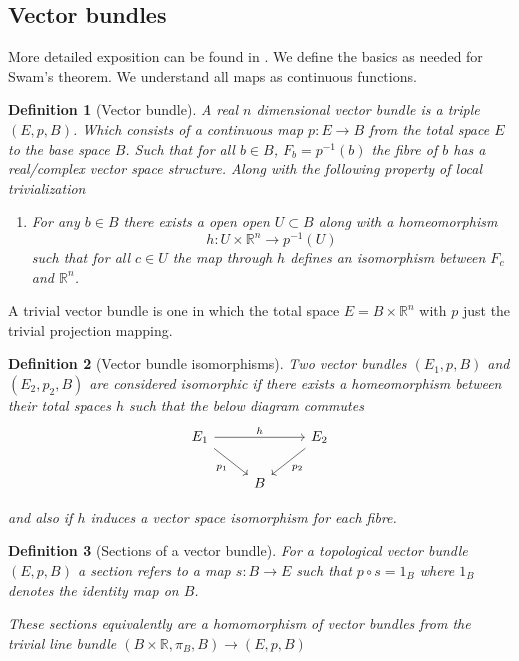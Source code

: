 \documentclass[12pt]{article}
\numberwithin{equation}{section}
\newcommand{\R}{\mathbb{R}}
\newtheorem{definition}{Definition}[section]
\begin{document}
\begin{appendices}
	
	\section{Vector bundles}
	More detailed exposition can be found in \cite{milnor1974characteristic}. We define the basics as needed for Swam's theorem. We understand all maps as continuous functions.
	\begin{definition}[Vector bundle]
		A real $n$ dimensional vector bundle is a triple $(E,p, B)$. Which consists of a continuous map $p:E \to B$ from the total space $E$ to the base space $B$. Such that for all $b \in B$, $F_b=p^{-1}(b)$ the fibre of $b$ has a real/complex vector space structure. Along with the following property of local trivialization
		\begin{enumerate}
			 \item For any $b \in B$ there exists a open open $U \subset B$ along with a homeomorphism \[ h: U \times \R^n	\to p^{-1}(U) \] such that for all $c \in U$ the map through $h$ defines an isomorphism between $F_c$ and $\R^n$.
		\end{enumerate}
	\end{definition}
	
	A trivial vector bundle is one in which the total space $E=B \times \R^n$ with $p$ just the trivial projection mapping.
	
	
	\begin{definition}[Vector bundle isomorphisms]
		Two vector bundles $(E_1,p, B)$ and $(E_2,p_2, B) $ are considered isomorphic if there exists a homeomorphism between their total spaces $h$ such that the below diagram commutes
		\[\begin{tikzcd}
			{E_1} && {E_2} \\
			& B
			\arrow["{p_1}"', from=1-1, to=2-2]
			\arrow["{p_2}", from=1-3, to=2-2]
			\arrow["h", from=1-1, to=1-3]
		\end{tikzcd}\]
		
		and also if $h$ induces a vector space isomorphism for each fibre.
	\end{definition}
	
	\begin{definition}[Sections of a vector bundle]
		For a topological vector bundle $(E,p,B)$ a section refers to a map	$s: B \to E$ such that $p \circ s= 1_B$ where $1_B$ denotes the identity map on $B$.
		
		These sections equivalently are a homomorphism of vector bundles from the trivial line bundle $(B \times \R, \pi_B, B) \to (E,p,B)$
	\end{definition}
%	
%	
%	

\end{appendices}
\end{document}
